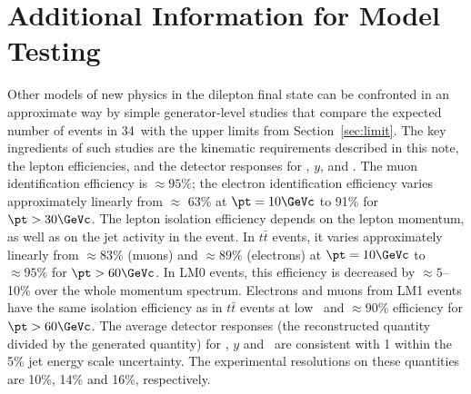 \section{Additional Information for Model Testing}
\label{sec:outreach}
Other models of new physics in the dilepton final state can be confronted in an approximate way by simple 
generator-level studies that compare the expected number of events in 34\pbinv\ 
with the upper limits from Section~\ref{sec:limit}.
The key ingredients of such studies are the kinematic requirements described 
in this note, the lepton efficiencies, and the detector responses for \HT, $y$, and \MET.
%
The muon identification efficiency is $\approx 95\%$;
the electron identification efficiency varies approximately linearly from $\approx$ 63\% at 
$\pt = 10\GeVc$ to 91\% for $\pt > 30\GeVc$.  
%
The lepton isolation efficiency depends on the lepton momentum, as well as on the jet activity in the 
event.
In $t\bar{t}$ events, it varies approximately linearly from $\approx 83\%$ (muons)
and $\approx 89\%$ (electrons) at $\pt=10\GeVc$ to $\approx 95\%$ for $\pt>60\GeVc$. 
In LM0 events, this efficiency is decreased by $\approx 5$--10\% over the whole momentum spectrum.
Electrons and muons from LM1 events have the same isolation efficiency as in $t\bar{t}$ events
at low \pt\ and $\approx 90$\% efficiency for $\pt>60\GeVc$.  
%
The average detector responses (the reconstructed quantity divided by the generated quantity) 
for \HT, $y$ and \MET\ are consistent with 1 within the 5\% jet energy scale uncertainty.
The experimental resolutions on these quantities are 10\%, 14\% and 16\%, respectively.



